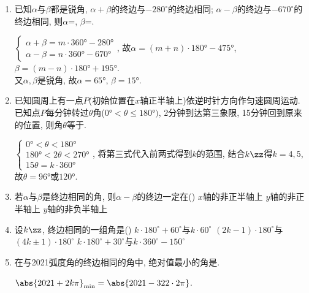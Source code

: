 \begin{enumerate}
\item 已知$\alpha$与$\beta$都是锐角, $\alpha+\beta$的终边与$-280^{\circ}$的终边相同; 
$\alpha-\beta$的终边与$-670^{\circ}$的终边相同, 则$\alpha$=, $\beta$=. 
\begin{jieda}
$\begin{cases}
\alpha+\beta=m\cdot\ang{360}-\ang{280}\\
\alpha-\beta=n\cdot\ang{360}-\ang{670}
\end{cases}$, 
故$\alpha=(m+n)\cdot\ang{180}-\ang{475}$, $\beta=(m-n)\cdot\ang{180}+\ang{195}$. \\
又$\alpha,\beta$是锐角, 故$\alpha=\ang{65}$, $\beta=\ang{15}$. 
\end{jieda}


\item 已知圆周上有一点$P$(初始位置在$x$轴正半轴上)依逆时针方向作匀速圆周运动. 已知点$P$每分钟转过$\theta$角($\ang{0}<\theta\leq\ang{180})$, 
2分钟到达第三象限, 15分钟回到原来的位置, 则角$\theta$等于. 
\begin{jieda}
$\begin{cases}
\ang{0}<\theta<\ang{180}\\
\ang{180}<2\theta<\ang{270}\\
15\theta=k\cdot\ang{360}
\end{cases}$, 
将第三式代入前两式得到$k$的范围, 结合$k\zz$得$k=4,5$, 故$\theta=\ang{96}$或$\ang{120}$. 
\end{jieda}


\item 若$\alpha$与$\beta$是终边相同的角, 则$\alpha-\beta$的终边一定在\dotfill()
{$x$轴的非正半轴上}
{$y$轴的非正半轴上}
{$y$轴的非负半轴上}



\item 设$k\zz$, 终边相同的一组角是\dotfill()
{$k\cdot 180^{\circ}+60^{\circ}$与$k\cdot 60^{\circ}$}
{$(2k-1)\cdot 180^{\circ}$与$(4k\pm 1)\cdot 180^{\circ}$}
{$k\cdot 180^{\circ}+30^{\circ}$与$k\cdot 360^{\circ}-150^{\circ}$}



\item 在与2021弧度角的终边相同的角中, 绝对值最小的角是. 
\begin{jieda}
$\abs{2021+2k\pi}_{\min}=\abs{2021-322\cdot2\pi}$. 
\end{jieda}




\end{enumerate}
